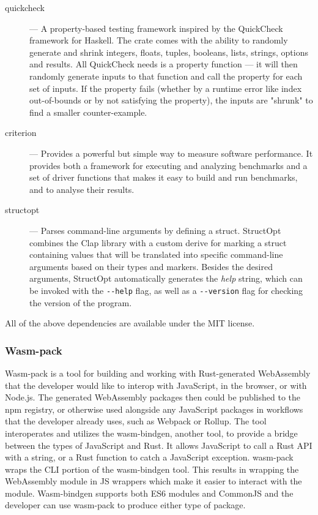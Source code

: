 \documentclass[english,bachelors,forcepolishlogotype]{wizthesis}
\begin{document}
\begin{description}
  \item[quickcheck] \cite{quickcheck} --- A property-based testing framework
  inspired by the QuickCheck framework for Haskell. The crate comes with the
  ability to randomly generate and shrink integers, floats, tuples, booleans,
  lists, strings, options and results. All QuickCheck needs is a property
  function --- it will then randomly generate inputs to that function and call
  the property for each set of inputs. If the property fails (whether by a
  runtime error like index out-of-bounds or by not satisfying the property), the
  inputs are "shrunk" to find a smaller counter-example.
  \item[criterion] \cite{criterion} --- Provides a powerful but simple way to
  measure software performance. It provides both a framework for executing and
  analyzing benchmarks and a set of driver functions that makes it easy to build
  and run benchmarks, and to analyse their results.
  \item[structopt] \cite{structopt} --- Parses command-line arguments by defining
  a struct. StructOpt combines the Clap library with a custom derive for marking
  a struct containing values that will be translated into specific command-line
  arguments based on their types and markers. Besides the desired arguments,
  StructOpt automatically generates the \emph{help} string, which can be invoked
  with the \verb|--help| flag, as well as a \verb|--version| flag for
  checking the version of the program.
\end{description}
All of the above dependencies are available under the MIT license.

\subsubsection*{Wasm-pack}

Wasm-pack \cite{wasm-pack} is a tool for building and working with
Rust-generated WebAssembly that the developer would like to interop with
JavaScript, in the browser, or with Node.js. The generated WebAssembly packages
then could be published to the npm registry, or otherwise used alongside any
JavaScript packages in workflows that the developer already uses, such as
Webpack or Rollup. The tool interoperates and utilizes the wasm-bindgen, another
tool, to provide a bridge between the types of JavaScript and Rust. It allows
JavaScript to call a Rust API with a string, or a Rust function to catch a
JavaScript exception. wasm-pack wraps the CLI portion of the wasm-bindgen tool.
This results in wrapping the WebAssembly module in JS wrappers which make it
easier to interact with the module. Wasm-bindgen supports both ES6 modules and
CommonJS and the developer can use wasm-pack to produce either type of package.
\end{document}
